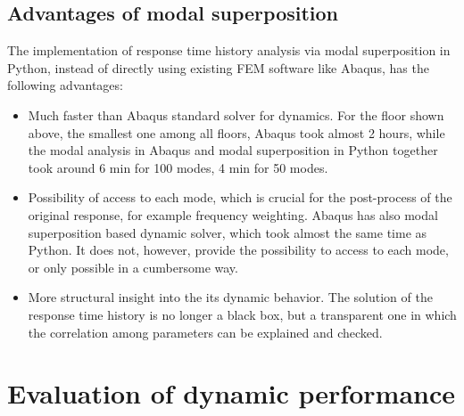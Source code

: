\subsection{Advantages of modal superposition}
The implementation of response time history analysis via modal superposition in Python, instead of directly using existing FEM software like Abaqus, has the following advantages:
\begin{itemize}
    \item Much faster than Abaqus standard solver for dynamics. For the floor shown above, the smallest one among all floors, Abaqus took almost 2 hours, while the modal analysis in Abaqus and modal superposition in Python together took around 6 min for 100 modes, 4 min for 50 modes.
    \item Possibility of access to each mode, which is crucial for the post-process of the original response, for example frequency weighting. Abaqus has also modal superposition based dynamic solver, which took almost the same time as Python. It does not, however, provide the possibility to access to each mode, or only possible in a cumbersome way. 
    \item More structural insight into the its dynamic behavior. The solution of the response time history is no longer a black box, but a transparent one in which the correlation among parameters can be explained and checked.
\end{itemize}


\section{Evaluation of dynamic performance}
